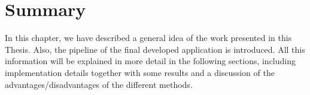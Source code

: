 \section{Summary}\label{ch:chapter01_03}

In this chapter, we have described a general idea of the work presented in this Thesis. Also, the pipeline of the final developed application is introduced. All this information will be explained in more detail in the following sections, including implementation details together with some results and a discussion of the advantages/disadvantages of the different methods.

